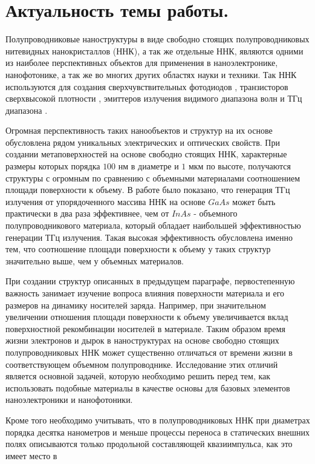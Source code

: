 \documentclass[a4paper,14pt,russian]{extreport}
\begin{document}
		\section{Актуальность темы работы.}
		Полупроводниковые наноструктуры в виде свободно стоящих
полупроводниковых нитевидных нанокристаллов (ННК), а так же отдельные ННК, являются одними из наиболее перспективных объектов для применения в наноэлектронике,
нанофотонике, а так же во многих других областях науки и техники. Так ННК используются для создания
сверхчувствительных фотодиодов \cite{semicondNNW2006}, транзисторов сверхвысокой плотности \cite{NNWtransistors}, эмиттеров излучения видимого диапазона волн \cite{singleNNWlaser} и ТГц диапазона \cite{THzGeneration}.\par
Огромная перспективность таких нанообъектов и структур на их основе обусловлена рядом уникальных электрических и оптических свойств. При создании метаповерхностей на основе свободно стоящих ННК, характерные размеры которых порядка $100 \text{ нм}$ в диаметре и $1 \text{ мкм}$ по высоте, получаются структуры с огромным по сравнению с объемными материалами соотношением площади поверхности к объему. В работе \cite{THzGeneration} было показано, что генерация ТГц излучения от упорядоченного массива ННК на основе $GaAs$ может быть практически в два раза эффективнее, чем от $InAs$ - объемного полупроводникового материала, который обладает наибольшей эффективностью генерации ТГц излучения. Такая высокая эффективность обусловлена именно тем, что соотношение площади поверхности к объему у таких структур значительно выше, чем у объемных материалов.\par
 При создании структур описанных в предыдущем параграфе, первостепенную важность занимает изучение вопроса влияния поверхности материала и его размеров на динамику носителей заряда. Например, при значительном увеличении отношения площади поверхности к объему увеличивается вклад поверхностной рекомбинации носителей в материале. Таким образом время жизни электронов и дырок в наноструктурах на основе свободно стоящих полупроводниковых ННК может существенно отличаться от времени жизни в соответствующем объемном полупроводнике. Исследование этих отличий является основной задачей, которую необходимо решить перед тем, как использовать подобные материалы в качестве основы для базовых элементов наноэлектроники и нанофотоники.\par
Кроме того необходимо учитывать, что в полупроводниковых ННК при диаметрах порядка десятка нанометров и меньше процессы переноса в статических внешних полях описываются только продольной составляющей квазиимпульса, как это имеет место в
\end{document}
